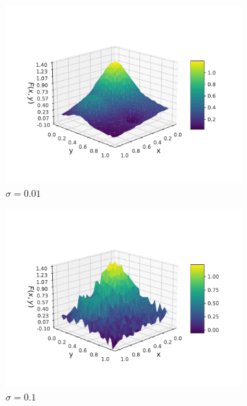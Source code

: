 \documentclass[twocolumn,english,notitlepage]{article}
\begin{document}
\begin{appendices}
\begin{figure}
\begin{subfigure}{.5\textwidth}
                \includegraphics[width=\linewidth]{franke_functions_0_01.pdf}
                \caption{$\sigma = 0.01$}
            \end{subfigure}
            \hfill
            \begin{subfigure}{.5\textwidth}
                \centering
                \includegraphics[width=\linewidth]{franke_functions_0_1.pdf}
                \caption{$\sigma = 0.1$}
            \end{subfigure}
            \begin{subfigure}{.5\textwidth}
                \centering

\end{subfigure}
\end{figure}
\end{appendices}
\end{document}
